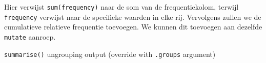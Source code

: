 \documentclass[]{tufte-book}
\newenvironment{Shaded}{}{}
\newcommand{\DataTypeTok}[1]{\textcolor[rgb]{0.56,0.13,0.00}{#1}}
\newcommand{\KeywordTok}[1]{\textcolor[rgb]{0.00,0.44,0.13}{\textbf{#1}}}
\newcommand{\NormalTok}[1]{#1}
\newcommand{\OperatorTok}[1]{\textcolor[rgb]{0.40,0.40,0.40}{#1}}
\newcommand{\StringTok}[1]{\textcolor[rgb]{0.25,0.44,0.63}{#1}}
\begin{document}
Hier verwijst \texttt{sum(frequency)} naar de som van de frequentiekolom, terwijl \texttt{frequency} verwijst naar de specifieke waarden in elke rij. Vervolgens zullen we de cumulatieve relatieve frequentie toevoegen. We kunnen dit toevoegen aan dezelfde \texttt{mutate} aanroep.

\begin{Shaded}
\end{Shaded}

\texttt{summarise()} ungrouping output (override with \texttt{.groups} argument)
\end{document}
